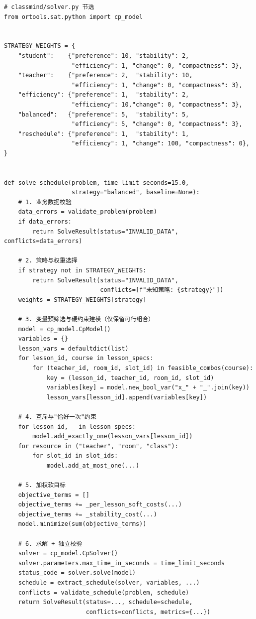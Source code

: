 \begin{lstlisting}[style=cmplain]
# classmind/solver.py 节选
from ortools.sat.python import cp_model


STRATEGY_WEIGHTS = {
    "student":    {"preference": 10, "stability": 2,
                   "efficiency": 1, "change": 0, "compactness": 3},
    "teacher":    {"preference": 2,  "stability": 10,
                   "efficiency": 1, "change": 0, "compactness": 3},
    "efficiency": {"preference": 1,  "stability": 2,
                   "efficiency": 10,"change": 0, "compactness": 3},
    "balanced":   {"preference": 5,  "stability": 5,
                   "efficiency": 5, "change": 0, "compactness": 3},
    "reschedule": {"preference": 1,  "stability": 1,
                   "efficiency": 1, "change": 100, "compactness": 0},
}


def solve_schedule(problem, time_limit_seconds=15.0,
                   strategy="balanced", baseline=None):
    # 1. 业务数据校验
    data_errors = validate_problem(problem)
    if data_errors:
        return SolveResult(status="INVALID_DATA", conflicts=data_errors)

    # 2. 策略与权重选择
    if strategy not in STRATEGY_WEIGHTS:
        return SolveResult(status="INVALID_DATA",
                           conflicts=[f"未知策略: {strategy}"])
    weights = STRATEGY_WEIGHTS[strategy]

    # 3. 变量预筛选与硬约束建模（仅保留可行组合）
    model = cp_model.CpModel()
    variables = {}
    lesson_vars = defaultdict(list)
    for lesson_id, course in lesson_specs:
        for (teacher_id, room_id, slot_id) in feasible_combos(course):
            key = (lesson_id, teacher_id, room_id, slot_id)
            variables[key] = model.new_bool_var("x_" + "_".join(key))
            lesson_vars[lesson_id].append(variables[key])

    # 4. 互斥与"恰好一次"约束
    for lesson_id, _ in lesson_specs:
        model.add_exactly_one(lesson_vars[lesson_id])
    for resource in ("teacher", "room", "class"):
        for slot_id in slot_ids:
            model.add_at_most_one(...)

    # 5. 加权软目标
    objective_terms = []
    objective_terms += _per_lesson_soft_costs(...)
    objective_terms += _stability_cost(...)
    model.minimize(sum(objective_terms))

    # 6. 求解 + 独立校验
    solver = cp_model.CpSolver()
    solver.parameters.max_time_in_seconds = time_limit_seconds
    status_code = solver.solve(model)
    schedule = extract_schedule(solver, variables, ...)
    conflicts = validate_schedule(problem, schedule)
    return SolveResult(status=..., schedule=schedule,
                       conflicts=conflicts, metrics={...})
\end{lstlisting}

